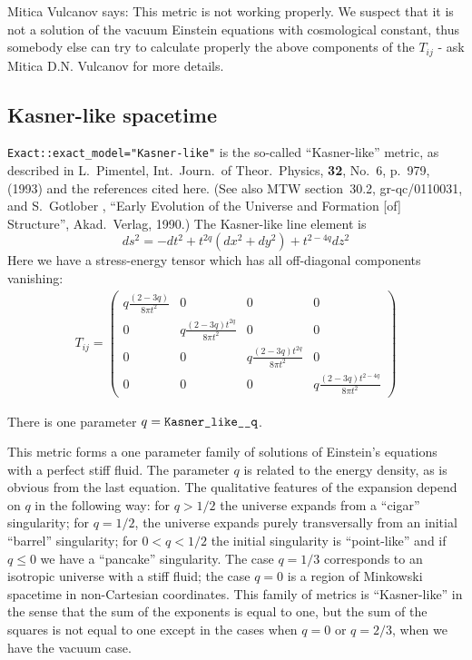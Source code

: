 Mitica Vulcanov says:
This metric is not working properly. We suspect that it is not a solution
of the vacuum Einstein equations with cosmological constant, thus
somebody else can try to calculate properly the above components
of the $T_{ij}$ - ask Mitica D.N. Vulcanov for more details.


\subsection{Kasner-like spacetime}

\verb|Exact::exact_model="Kasner-like"| is the so-called
``Kasner-like'' metric, as described in L.~Pimentel,
Int.\ Journ.\ of Theor.\ Physics, {\bf 32},  No.~6, p.~979, (1993)
and the references cited here.  (See also MTW section~30.2,
gr-qc/0110031, and S.~Gotlober \etal{},
``Early Evolution of the Universe and Formation [of] Structure'',
Akad.\ Verlag, 1990.)
The Kasner-like line element is
\begin{equation}
ds^2 = -dt^2 + t^{2q} (dx^2 +dy^2) + t^{2 - 4q}dz^2
\end{equation}
Here we have a stress-energy tensor which has all off-diagonal components 
vanishing:
\begin{eqnarray}
T_{ij} = \left(
	 \begin{array}{cccc}
	 q\frac{(2-3 q)}{8 \pi t^2} & 0 & 0 & 0 \\
	 0 & q\frac{(2-3 q)t^{2q}}{8 \pi t^2} & 0 & 0\\
	 0 & 0 & q\frac{(2-3 q)t^{2q}}{8 \pi t^2} & 0\\
	 0 & 0 & 0 & q\frac{(2-3q)t^{2-4q}}{8 \pi t^2}%
	 \end{array}
	 \right)
\end{eqnarray}

There is one parameter $q = \verb|Kasner_like__q|$.

This metric forms a one parameter family of solutions of Einstein's
equations with a perfect stiff fluid. The parameter $q$ is related to
the energy density, as is obvious from the last equation. The
qualitative features of the expansion depend on $q$ in the following
way: for $q > 1/2$ the universe expands from a ``cigar'' singularity;
for $q = 1/2$, the universe expands purely transversally from an
initial ``barrel'' singularity; for $0 < q < 1/2$ the initial
singularity is ``point-like'' and if $q \leq 0$ we have a ``pancake''
singularity. The case $q=1/3$ corresponds to an isotropic universe
with a stiff fluid; the case $q=0$ is a region of Minkowski spacetime
in non-Cartesian coordinates. This family of metrics is ``Kasner-like''
in the sense that the sum of the exponents is equal to one, but the
sum of the squares is not equal to one except in the cases when $q=0$
or $q=2/3$, when we have the vacuum case.

